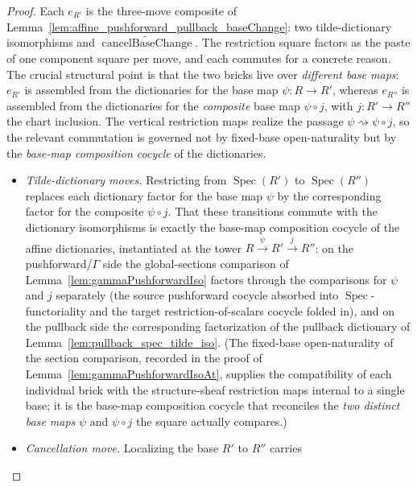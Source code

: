 \begin{proof}
  Each \(e_{R'}\) is the three-move composite of
  Lemma~\ref{lem:affine_pushforward_pullback_baseChange}: two tilde-dictionary
  isomorphisms and \(\widetilde{\operatorname{cancelBaseChange}}\). The restriction
  square factors as the paste of one component square per move, and each commutes for a
  concrete reason. The crucial structural point is that the two bricks live over
  \emph{different base maps}: \(e_{R'}\) is assembled from the dictionaries for the base map
  \(\psi : R \to R'\), whereas \(e_{R''}\) is assembled from the dictionaries for the
  \emph{composite} base map \(\psi \circ j\), with \(j : R' \to R''\) the chart inclusion.
  The vertical restriction maps realize the passage \(\psi \rightsquigarrow \psi\circ j\), so
  the relevant commutation is governed not by fixed-base open-naturality but by the
  \emph{base-map composition cocycle} of the dictionaries.
  \begin{itemize}
    \item \emph{Tilde-dictionary moves.} Restricting from \(\operatorname{Spec}(R')\)
      to \(\operatorname{Spec}(R'')\) replaces each dictionary factor for the base map
      \(\psi\) by the corresponding factor for the composite \(\psi\circ j\). That these
      transitions commute with the dictionary isomorphisms is exactly the base-map
      composition cocycle of the affine dictionaries, instantiated at the tower
      \(R \xrightarrow{\psi} R' \xrightarrow{j} R''\): on the pushforward/\(\Gamma\) side the
      global-sections comparison of Lemma~\ref{lem:gammaPushforwardIso} factors through the
      comparisons for \(\psi\) and \(j\) separately (the source pushforward cocycle absorbed into
      \(\operatorname{Spec}\)-functoriality and the target restriction-of-scalars cocycle folded
      in), and on the pullback side the corresponding factorization of the pullback dictionary of
      Lemma~\ref{lem:pullback_spec_tilde_iso}. (The fixed-base open-naturality of the section
      comparison, recorded in the proof of Lemma~\ref{lem:gammaPushforwardIsoAt}, supplies the
      compatibility of each individual brick with the structure-sheaf restriction maps internal
      to a single base; it is the base-map composition cocycle that reconciles the \emph{two
      distinct base maps} \(\psi\) and \(\psi\circ j\) the square actually compares.)
    \item \emph{Cancellation move.} Localizing the base \(R'\) to \(R''\) carries

\end{itemize}
\end{proof}
